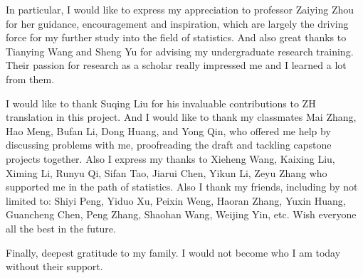 In particular, I would like to express my appreciation to professor Zaiying Zhou for her guidance, encouragement and inspiration, which are largely the driving force for my further study into the field of statistics. And also great thanks to Tianying Wang and Sheng Yu for advising my undergraduate research training. Their passion for research as a scholar really impressed me and I learned a lot from them.

I would like to thank Suqing Liu for his invaluable contributions to ZH translation in this project. And I would like to thank my classmates Mai Zhang, Hao Meng, Bufan Li, Dong Huang, and Yong Qin, who offered me help by discussing problems with me, proofreading the draft and tackling capstone projects together. Also I express my thanks to Xieheng Wang, Kaixing Liu, Ximing Li, Runyu Qi, Sifan Tao, Jiarui Chen, Yikun Li, Zeyu Zhang who supported me in the path of statistics. Also I thank my friends, including by not limited to: Shiyi Peng, Yiduo Xu, Peixin Weng, Haoran Zhang, Yuxin Huang, Guancheng Chen, Peng Zhang, Shaohan Wang, Weijing Yin, etc. Wish everyone all the best in the future. 

Finally, deepest gratitude to my family. I would not become who I am today without their support.





